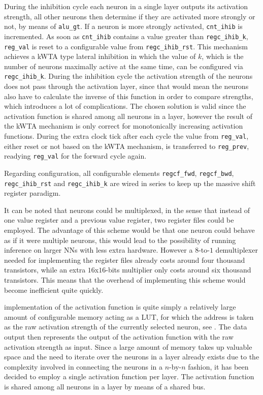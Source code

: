 During the inhibition cycle each neuron in a single layer outputs its activation strength, all other neurons then determine if they are activated more strongly or not, by means of \texttt{alu\_gt}. If a neuron is more strongly activated, \texttt{cnt\_ihib} is incremented. As soon as \texttt{cnt\_ihib} contains a value greater than \texttt{regc\_ihib\_k}, \texttt{reg\_val} is reset to a configurable value from \texttt{regc\_ihib\_rst}. This mechanism achieves a \ac{kWTA} type lateral inhibition in which the value of $k$, which is the number of neurons maximally active at the same time, can be configured via \texttt{regc\_ihib\_k}. During the inhibition cycle the activation strength of the neurons does not pass through the activation layer, since that would mean the neurons also have to calculate the inverse of this function in order to compare strengths, which introduces a lot of complications. The chosen solution is valid since the activation function is shared among all neurons in a layer, however the result of the \ac{kWTA} mechanism is only correct for monotonically increasing activation functions. During the extra clock tick after each cycle the value from \texttt{reg\_val}, either reset or not based on the \ac{kWTA} mechanism, is transferred to \texttt{reg\_prev}, readying \texttt{reg\_val} for the forward cycle again.

Regarding configuration, all configurable elements \texttt{regcf\_fwd}, \texttt{regcf\_bwd}, \texttt{regc\_ihib\_rst} and \texttt{regc\_ihib\_k} are wired in series to keep up the massive shift register paradigm.

It can be noted that neurons could be multiplexed, in the sense that instead of one value register and a previous value register, two register files could be employed. The advantage of this scheme would be that one neuron could behave as if it were multiple neurons, this would lead to the possibility of running inference on larger \acp{NN} with less extra hardware. However a $8$-to-$1$ demultiplexer needed for implementing the register files already costs around four thousand transistors, while an extra $16$x$16$-bits multiplier only costs around six thousand transistors. This means that the overhead of implementing this scheme would become inefficient quite quickly.

 implementation of the activation function is quite simply a relatively large amount of configurable memory acting as a \ac{LUT}, for which the address is taken as the raw activation strength of the currently selected neuron, see . The data output then represents the output of the activation function with the raw activation strength as input. Since a large amount of memory takes up valuable space and the need to iterate over the neurons in a layer already exists due to the complexity involved in connecting the neurons in a $n$-by-$n$ fashion, it has been decided to employ a single activation function per layer. The activation function is shared among all neurons in a layer by means of a shared bus.

